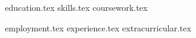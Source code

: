 \documentclass[11pt, letterpaper]{awesome-cv}
\newcommand*{\sectiondir}{resume/}
\begin{document}
\makecvheader%

\begin{minipage}[t]{0.32\textwidth} 

{education.tex}
{skills.tex}
{coursework.tex}

\end{minipage} 
\hfill
\begin{minipage}[t]{0.66\textwidth} 

{employment.tex}
{experience.tex}
{extracurricular.tex}

\end{minipage} 
\end{document}
